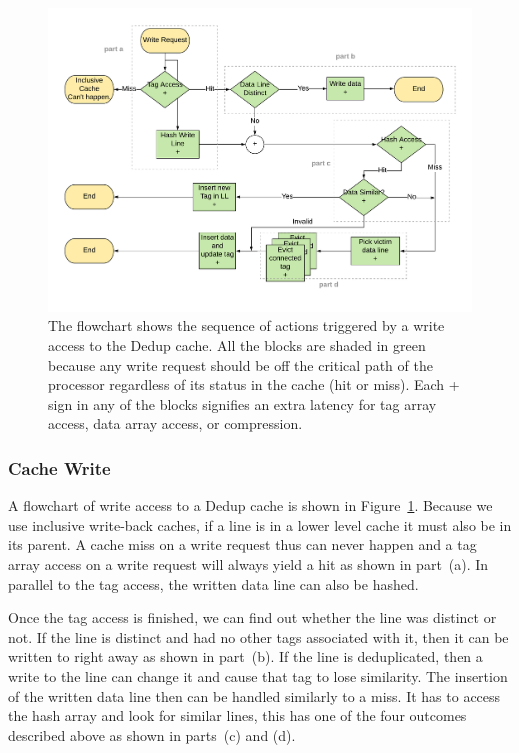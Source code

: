 \begin{figure}[h]
    \includegraphics[width=\textwidth]{Dedup_Write.pdf}
    \caption[Dedup Write]{The flowchart shows the sequence of actions triggered by a write access to the Dedup cache. All the blocks are shaded in green because any write request should be off the critical path of the processor regardless of its status in the cache (hit or miss). Each + sign in any of the blocks signifies an extra latency for tag array access, data array access, or compression.}
    \label{fig:Dedup_Write}
\end{figure}
\subsubsection{Cache Write}
A flowchart of write access to a Dedup cache is shown in Figure~\ref{fig:Dedup_Write}. Because we use inclusive write-back caches, if a line is in a lower level cache it must also be in its parent. A cache miss on a write request thus can never happen and a tag array access on a write request will always yield a hit as shown in part~(a). In parallel to the tag access, the written data line can also be hashed.\par
Once the tag access is finished, we can find out whether the line was distinct or not. If the line is distinct and had no other tags associated with it, then it can be written to right away as shown in part~(b). If the line is deduplicated, then a write to the line can change it and cause that tag to lose similarity. The insertion of the written data line then can be handled similarly to a miss. It has to access the hash array and look for similar lines, this has one of the four outcomes described above as shown in parts~(c) and (d).

